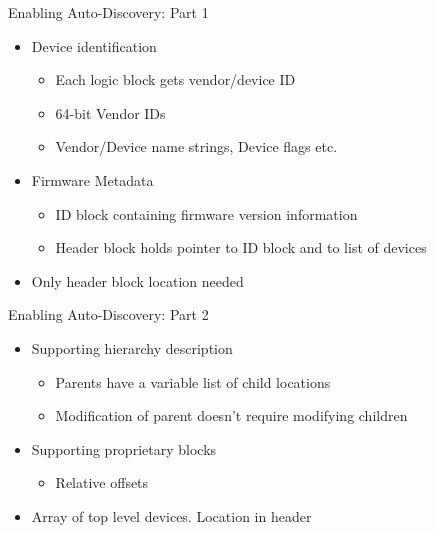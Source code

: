 \documentclass{beamer}
\begin{document}
\begin{frame}{Enabling Auto-Discovery: Part 1}
  \begin{itemize}
    \item Device identification
      \begin{itemize}
        \pause \item Each logic block gets vendor/device ID
        \pause \item 64-bit Vendor IDs
	\pause \item Vendor/Device name strings, Device flags etc.
      \end{itemize}
    \pause \item Firmware Metadata
      \begin{itemize}
        \pause \item ID block containing firmware version information
	\pause \item Header block holds pointer to ID block and to list of devices
      \end{itemize}
    \pause \item Only header block location needed
  \end{itemize}
\end{frame}

\begin{frame}{Enabling Auto-Discovery: Part 2}
  \begin{itemize}
    \item Supporting hierarchy description
      \begin{itemize}
	\pause \item Parents have a variable list of child locations
	\pause \item Modification of parent doesn't require modifying children
      \end{itemize}
    \pause \item Supporting proprietary blocks
      \begin{itemize}
        \pause \item Relative offsets
      \end{itemize}
    \pause \item Array of top level devices. Location in header %
  \end{itemize}
\end{frame}
\end{document}
